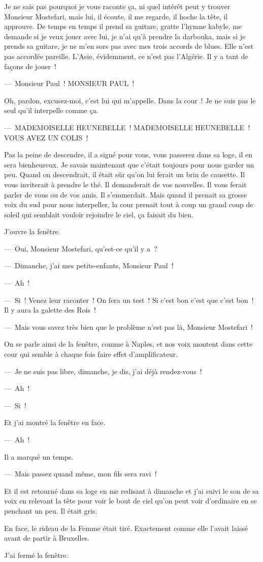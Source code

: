 \documentclass[french,twoside]{book} %
\begin{document}
\noindent Je ne sais pas pourquoi je vous raconte ça, ni quel intérêt peut y trouver Monsieur Mostefari, mais lui, il écoute, il me regarde, il hoche la tête, il approuve. De temps en temps il prend sa guitare, gratte l’hymne kabyle, me demande si je veux jouer avec lui, je n’ai qu’à prendre la darbouka, mais si je prends sa guitare, je ne m’en sors pas avec mes trois accords de blues. Elle n’est pas accordée pareille. L’Asie, évidemment, ce n’est pas l’Algérie. Il y a tant de façons de jouer !\par
— Monsieur Paul ! MONSIEUR PAUL !\par
Oh, pardon, excusez-moi, c’est lui qui m’appelle. Dans la cour ! Je ne suis pas le seul qu’il interpelle comme ça.\par
— MADEMOISELLE HEUNEBELLE ! MADEMOISELLE HEUNEBELLE ! VOUS AVEZ UN COLIS !\par
Pas la peine de descendre, il a signé pour vous, vous passerez dans sa loge, il en sera bienheureux. Je savais maintenant que c’était toujours pour nous garder un peu. Quand on descendrait, il était sûr qu’on lui ferait un brin de causette. Il vous inviterait à prendre le thé. Il demanderait de vos nouvelles. Il vous ferait parler de vous ou de vos amis. Il s’emmerdait. Mais quand il prenait sa grosse voix du sud pour nous interpeller, la cour prenait tout à coup un grand coup de soleil qui semblait vouloir rejoindre le ciel, ça faisait du bien.\par
J’ouvre la fenêtre.\par
— Oui, Monsieur Mostefari, qu’est-ce qu’il y a ?\par
— Dimanche, j’ai mes petits-enfants, Monsieur Paul !\par
— Ah !\par
— Si ! Venez leur raconter ! On fera un test ! Si c’est bon c’est que c’est bon ! Il y aura la galette des Rois !\par
— Mais vous savez très bien que le problème n’est pas là, Monsieur Mostefari !\par
On se parle ainsi de la fenêtre, comme à Naples, et nos voix montent dans cette cour qui semble à chaque fois faire effet d’amplificateur.\par
— Je ne suis pas libre, dimanche, je dis, j’ai déjà rendez-vous !\par
— Ah !\par
— Si !\par
Et j’ai montré la fenêtre en face.\par
— Ah !\par
Il a marqué un temps.\par
— Mais passez quand même, mon fils sera ravi !\par
Et il est retourné dans sa loge en me redisant à dimanche et j’ai suivi le son de sa voix en relevant la tête pour voir le bout de ciel qu’on peut voir d’ordinaire en se penchant un peu. Il était gris.\par
En face, le rideau de la Femme était tiré. Exactement comme elle l’avait laissé avant de partir à Bruxelles.\par
J’ai fermé la fenêtre.\par
\bigbreak
\end{document}
